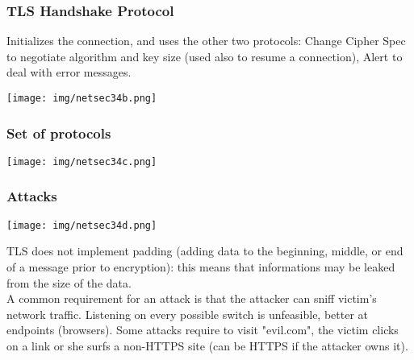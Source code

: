 \documentclass[a4paper, 10pt, titlepage]{article}
\begin{document}
\subsubsection*{TLS Handshake Protocol}
Initializes the connection, and uses the other two protocols: Change Cipher Spec to negotiate algorithm and key size (used also to resume a connection), Alert to deal with error messages.
\begin{center}
	\texttt{[image: img/netsec34b.png]}
\end{center}

\subsubsection*{Set of protocols}
\begin{center}
	\texttt{[image: img/netsec34c.png]}
\end{center}

\subsubsection*{Attacks}
\begin{center}
	\texttt{[image: img/netsec34d.png]}
\end{center}
TLS does not implement padding (adding data to the beginning, middle, or end of a message prior to encryption): this means that informations may be leaked from the size of the data. \medskip\\
A common requirement for an attack is that the attacker can sniff victim’s network traffic. Listening on every possible switch is unfeasible, better at endpoints (browsers). Some attacks require to visit "evil.com", the victim clicks on a link or she surfs a non-HTTPS site (can be HTTPS if the attacker owns it).
\end{document}
